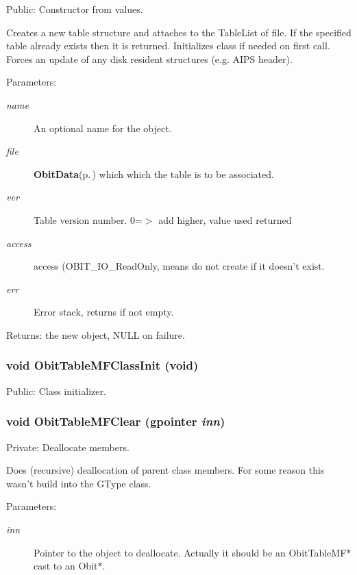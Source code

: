 Public: Constructor from values. 

Creates a new table structure and attaches to the Table\-List of file. If the specified table already exists then it is returned. Initializes class if needed on first call. Forces an update of any disk resident structures (e.g. AIPS header). \begin{Desc}
\item[Parameters:]
\begin{description}
\item[{\em name}]An optional name for the object. \item[{\em file}]{\bf Obit\-Data}{\rm (p.\,\pageref{structObitData})} which which the table is to be associated. \item[{\em ver}]Table version number. 0=$>$ add higher, value used returned \item[{\em access}]access (OBIT\_\-IO\_\-Read\-Only, means do not create if it doesn't exist. \item[{\em err}]Error stack, returns if not empty. \end{description}
\end{Desc}
\begin{Desc}
\item[Returns:]the new object, NULL on failure. \end{Desc}
\subsubsection{\setlength{\rightskip}{0pt plus 5cm}void Obit\-Table\-MFClass\-Init (void)}\label{ObitTableMF_8c_a27}


Public: Class initializer. 

\subsubsection{\setlength{\rightskip}{0pt plus 5cm}void Obit\-Table\-MFClear (gpointer {\em inn})}\label{ObitTableMF_8c_a9}


Private: Deallocate members. 

Does (recursive) deallocation of parent class members. For some reason this wasn't build into the GType class. \begin{Desc}
\item[Parameters:]
\begin{description}
\item[{\em inn}]Pointer to the object to deallocate. Actually it should be an Obit\-Table\-MF$\ast$ cast to an Obit$\ast$. \end{description}
\end{Desc}
